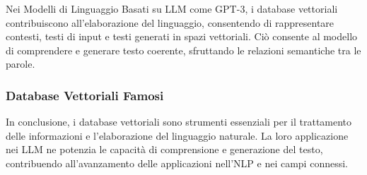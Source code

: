 Nei Modelli di Linguaggio Basati su LLM come GPT-3, i database vettoriali contribuiscono all'elaborazione del linguaggio, consentendo di rappresentare contesti, testi di input e testi generati in spazi vettoriali. Ciò consente al modello di comprendere e generare testo coerente, sfruttando le relazioni semantiche tra le parole.

\subsubsection{Database Vettoriali Famosi}



In conclusione, i database vettoriali sono strumenti essenziali per il trattamento delle informazioni e l'elaborazione del linguaggio naturale. La loro applicazione nei LLM ne potenzia le capacità di comprensione e generazione del testo, contribuendo all'avanzamento delle applicazioni nell'NLP e nei campi connessi.